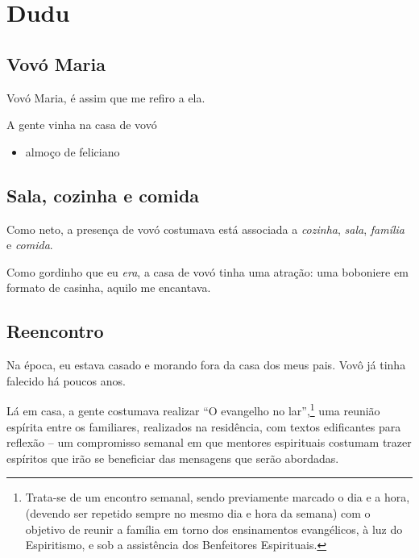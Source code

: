 \documentclass[
  brazil,
  a6paper,
  oneside,
  landscape,
  14pt]{scrbook}
\providecommand{\tightlist}{%
  \setlength{\itemsep}{0pt}\setlength{\parskip}{0pt}}
\begin{document}
\hypertarget{dudu}{%
\section{Dudu}\label{dudu}}

\hypertarget{vovuxf3-maria}{%
\subsection{Vovó Maria}\label{vovuxf3-maria}}

Vovó Maria, é assim que me refiro a ela.

A gente vinha na casa de vovó

\begin{itemize}
\tightlist
\item
  almoço de feliciano
\end{itemize}

\hypertarget{sala-cozinha-e-comida}{%
\subsection{Sala, cozinha e comida}\label{sala-cozinha-e-comida}}

Como neto, a presença de vovó costumava está associada a \emph{cozinha},
\emph{sala}, \emph{família} e \emph{comida}.

Como gordinho que eu \emph{era}, a casa de vovó tinha uma atração: uma
boboniere em formato de casinha, aquilo me encantava.

\hypertarget{reencontro}{%
\subsection{Reencontro}\label{reencontro}}

Na época, eu estava casado e morando fora da casa dos meus pais. Vovô já
tinha falecido há poucos anos.

Lá em casa, a gente costumava realizar ``O evangelho no
lar'',\footnote{Trata-se de um encontro semanal, sendo previamente
  marcado o dia e a hora, (devendo ser repetido sempre no mesmo dia e
  hora da semana) com o objetivo de reunir a família em torno dos
  ensinamentos evangélicos, à luz do Espiritismo, e sob a assistência
  dos Benfeitores Espirituais.} uma reunião espírita entre os
familiares, realizados na residência, com textos edificantes para
reflexão -- um compromisso semanal em que mentores espirituais costumam
trazer espíritos que irão se beneficiar das mensagens que serão
abordadas.
\end{document}
